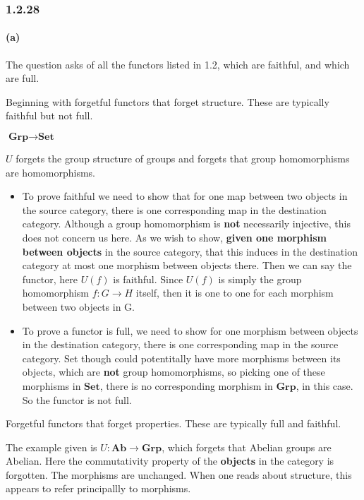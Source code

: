 \documentclass{article}
\begin{document}
\subsubsection*{1.2.28}

\paragraph{(a)}

The question asks of all the functors listed in 1.2, which are faithful, and which are full.

Beginning with forgetful functors that forget structure. These are typically faithful but not full.

$\textbf{Grp} \rightarrow \textbf{Set}$

$U$ forgets the group structure of groups and forgets that group homomorphisms are homomorphisms.

\begin{itemize}
\item To prove faithful we need to show that for one map between two objects in the source category, there is one corresponding map in the destination category. Although a group homomorphism is \textbf{not} necessarily injective, this does not concern us here. As we wish to show, \textbf{given one morphism between objects} in the source category, that this induces in the destination category at most one morphism between objects there. Then we can say the functor, here $U(f)$ is faithful. Since $U(f)$ is simply the group homomorphism $f\colon G \rightarrow H$ itself, then it is one to one for each morphism between two objects in G.

\item To prove a functor is full, we need to show for one morphism between objects in the destination category, there is one corresponding map in the source category. Set though could potentitally have more morphisms between its objects, which are \textbf{not} group homomorphisms, so picking one of these morphisms in $\textbf{Set}$, there is no corresponding morphism in $\textbf{Grp}$, in this case. So the functor is not full.
\end{itemize}


Forgetful functors that forget properties. These are typically full and faithful.

The example given is $U:\textbf{Ab} \rightarrow \textbf{Grp}$, which forgets that Abelian groups are Abelian. Here the commutativity property of the \textbf{objects} in the category is forgotten. The morphisms are unchanged. When one reads about structure, this appears to refer principallly to morphisms.
\end{document}
